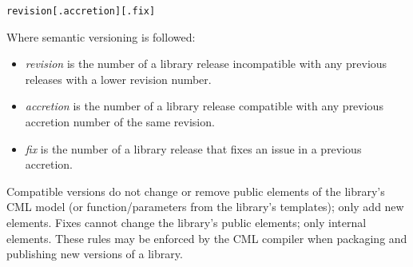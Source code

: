 \verbatimfont{\small}
\begin{verbatim}
revision[.accretion][.fix]
\end{verbatim}

Where semantic versioning \cite{semver} is followed:
\begin{itemize}
\item \emph{revision} is the number of a library release incompatible with any previous releases with a lower revision number.
\item \emph{accretion} is the number of a library release compatible with any previous accretion number of the same revision.
\item \emph{fix} is the number of a library release that fixes an issue in a previous accretion.
\end{itemize}

Compatible versions do not change or remove public elements of the library's CML model (or function/parameters from the library's templates); only add new elements. Fixes cannot change the library's public elements; only internal elements. These rules may be enforced by the CML compiler when packaging and publishing new versions of a library.
